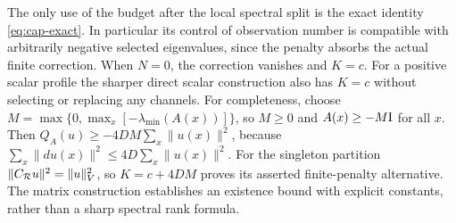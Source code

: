 \begin{remark}\label{rem:cap}
The only use of the budget after the local spectral split is the exact
identity \eqref{eq:cap-exact}. In particular its control of observation
number is compatible with arbitrarily negative selected eigenvalues, since
the penalty absorbs the actual finite correction. When $N=0$, the correction
vanishes and $K=c$. For a positive scalar profile the sharper direct scalar
construction also has $K=c$ without selecting or replacing any channels.
For completeness, choose
$M=\max\{0,\max_x[-\lambda_{\min}(A(x))]\}$, so $M\ge0$
and $A(x)\ge-M\mathrm I$ for all $x$. Then
$Q_A(u)\ge-4DM\sum_x\|u(x)\|^2$, because
$\sum_x\|du(x)\|^2\le4D\sum_x\|u(x)\|^2$.
For the singleton partition $\|C_{\mathcal R}u\|^2=\|u\|_{V}^2$,
so $K=c+4DM$ proves its asserted finite-penalty alternative.
The matrix construction establishes an existence bound with explicit
constants, rather than a sharp spectral rank formula.
\end{remark}
